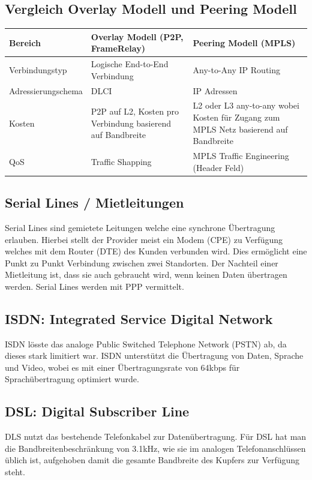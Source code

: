 \subsection{Vergleich Overlay Modell und Peering Modell}
\begin{tabu} to \linewidth {|X|X|X|}
	\hline
	Bereich & Overlay Modell (P2P, FrameRelay) & Peering Modell (MPLS) \\ 
	\hline \hline
	Verbindungstyp & Logische End-to-End Verbindung & Any-to-Any IP Routing \\	
	\hline
	Adressierungschema & DLCI & IP Adressen \\	
	\hline
	Kosten & P2P auf L2, Kosten pro Verbindung basierend auf Bandbreite & L2 oder L3 any-to-any wobei Kosten für Zugang zum MPLS Netz basierend auf Bandbreite\\	
	\hline
	QoS & Traffic Shapping & MPLS Traffic Engineering (Header Feld) \\	
	\hline
\end{tabu}

\subsection{Serial Lines / Mietleitungen}
Serial Lines sind gemietete Leitungen welche eine synchrone Übertragung erlauben. Hierbei stellt der Provider meist ein Modem (CPE) zu Verfügung welches mit dem Router (DTE) des Kunden verbunden wird. Dies ermöglicht eine Punkt zu Punkt Verbindung zwischen zwei Standorten. Der Nachteil einer Mietleitung ist, dass sie auch gebraucht wird, wenn keinen Daten übertragen werden. Serial Lines werden mit PPP vermittelt.

\subsection{ISDN: Integrated Service Digital Network}
ISDN lösste das analoge Public Switched Telephone Network (PSTN) ab, da dieses stark limitiert war. ISDN unterstützt die Übertragung von Daten, Sprache und Video, wobei es mit einer Übertragungsrate von 64kbps für Sprachübertragung optimiert wurde. 

\subsection{DSL: Digital Subscriber Line}
DLS nutzt das bestehende Telefonkabel zur Datenübertragung. Für DSL hat man die Bandbreitenbeschränkung von 3.1kHz, wie sie im analogen Telefonanschlüssen üblich ist, aufgehoben damit die gesamte Bandbreite des Kupfers zur Verfügung steht.

